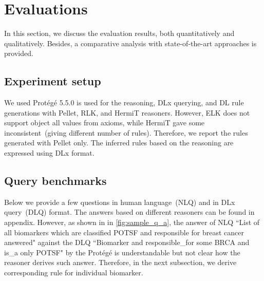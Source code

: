 \section{Evaluations}\label{chapter_8:results}
In this section, we discuss the evaluation results, both quantitatively and qualitatively. Besides, a comparative analysis with state-of-the-art approaches is provided. 

\subsection{Experiment setup}
We used Prot{\'e}g{\'e} 5.5.0 is used for the reasoning, DLx querying, and DL rule generations with Pellet, RLK, and HermiT reasoners. 
However, ELK does not support object all values from axioms, while HermiT gave some inconsistent~(giving different number of rules). Therefore, we report the rules generated with Pellet only. The inferred rules based on the reasoning are expressed using DLx format. 

\subsection{Query benchmarks}
Below we provide a few questions in human language~(NLQ) and in DLx query~(DLQ) format. The answers based on different reasoners can be found in appendix. However, as shown in in \cref{fig:sample_q_a}, the answer of NLQ ``List of all biomarkers which are classified POTSF and responsible for breast cancer answered" against the DLQ ``Biomarker and responsible\_for some BRCA and is\_a only POTSF" by the Prot{\'e}g{\'e} is understandable but not clear how the reasoner derives such answer. Therefore, in the next subsection, we derive corresponding rule for individual biomarker. 

